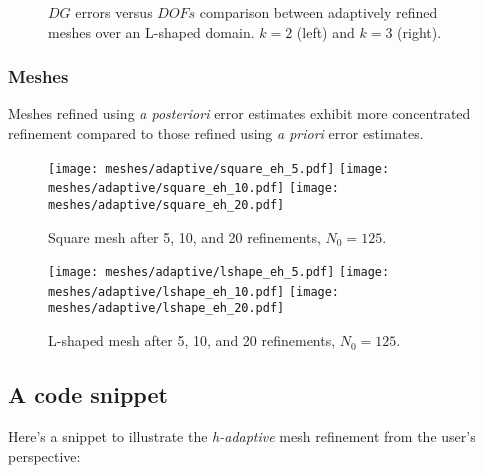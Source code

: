 \begin{figure}[!ht]
	\begin{subfigure}[b]{0.45\textwidth}
		
	\end{subfigure}
	\hfill
	\begin{subfigure}[b]{0.45\textwidth}
	\end{subfigure}
    \caption{$DG$ errors versus $DOFs$ comparison between adaptively refined meshes over an L-shaped domain. $k = 2$ (left) and $k = 3$ (right).}
\end{figure}

\newpage
\subsubsection{Meshes}

Meshes refined using \textit{a posteriori} error estimates exhibit more concentrated refinement compared to those refined using \textit{a priori} error estimates.

\begin{figure}[!ht]
	\centering
	\texttt{[image: meshes/adaptive/square\_eh\_5.pdf]}
	\texttt{[image: meshes/adaptive/square\_eh\_10.pdf]}
	\texttt{[image: meshes/adaptive/square\_eh\_20.pdf]}
	\caption{Square mesh after 5, 10, and 20 refinements, $N_0 = 125$.}
\end{figure}

\begin{figure}[!ht]
	\centering
	\texttt{[image: meshes/adaptive/lshape\_eh\_5.pdf]}
	\texttt{[image: meshes/adaptive/lshape\_eh\_10.pdf]}
	\texttt{[image: meshes/adaptive/lshape\_eh\_20.pdf]}
	\caption{L-shaped mesh after 5, 10, and 20 refinements, $N_0 = 125$.}
\end{figure}

\newpage
\subsection{A code snippet}

Here's a snippet to illustrate the \textit{h-adaptive} mesh refinement from the user's perspective:

